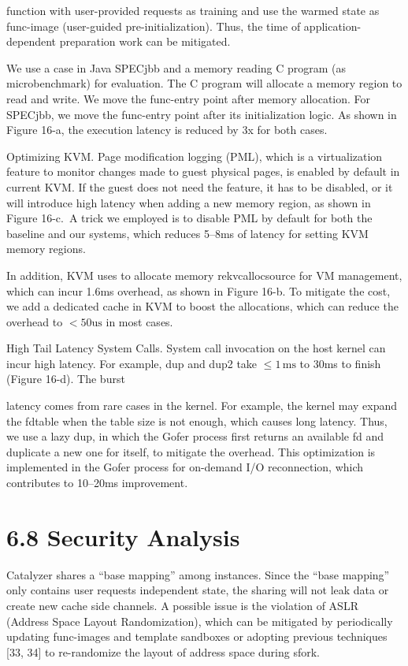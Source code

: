 \documentclass[
  10
]{article}
\begin{document}
function with user-provided requests as training and use the warmed
state as func-image (user-guided pre-initialization). Thus, the time of
application-dependent preparation work can be mitigated.

We use a case in Java SPECjbb and a memory reading C program (as
microbenchmark) for evaluation. The C program will allocate a memory
region to read and write. We move the func-entry point after memory
allocation. For SPECjbb, we move the func-entry point after its
initialization logic. As shown in Figure 16-a, the execution latency is
reduced by 3x for both cases.

Optimizing KVM. Page modification logging (PML), which is a
virtualization feature to monitor changes made to guest physical pages,
is enabled by default in current KVM. If the guest does not need the
feature, it has to be disabled, or it will introduce high latency when
adding a new memory region, as shown in Figure 16-c.~A trick we employed
is to disable PML by default for both the baseline and our systems,
which reduces 5--8ms of latency for setting KVM memory regions.

In addition, KVM uses to allocate memory rekvcallocsource for VM
management, which can incur 1.6ms overhead, as shown in Figure 16-b. To
mitigate the cost, we add a dedicated cache in KVM to boost the
allocations, which can reduce the overhead to \(< 5 0 \mathrm { u s }\)
in most cases.

High Tail Latency System Calls. System call invocation on the host
kernel can incur high latency. For example, dup and dup2 take \(\le 1\,\mathrm{ms}\) to
30ms to finish (Figure 16-d). The burst

latency comes from rare cases in the kernel. For example, the kernel may
expand the fdtable when the table size is not enough, which causes long
latency. Thus, we use a lazy dup, in which the Gofer process first
returns an available fd and duplicate a new one for itself, to mitigate
the overhead. This optimization is implemented in the Gofer process for
on-demand I/O reconnection, which contributes to 10--20ms improvement.

\section{6.8 Security Analysis}\label{security-analysis}

Catalyzer shares a ``base mapping'' among instances. Since the ``base
mapping'' only contains user requests independent state, the sharing
will not leak data or create new cache side channels. A possible issue
is the violation of ASLR (Address Space Layout Randomization), which can
be mitigated by periodically updating func-images and template sandboxes
or adopting previous techniques {[}33, 34{]} to re-randomize the layout
of address space during sfork.
\end{document}
